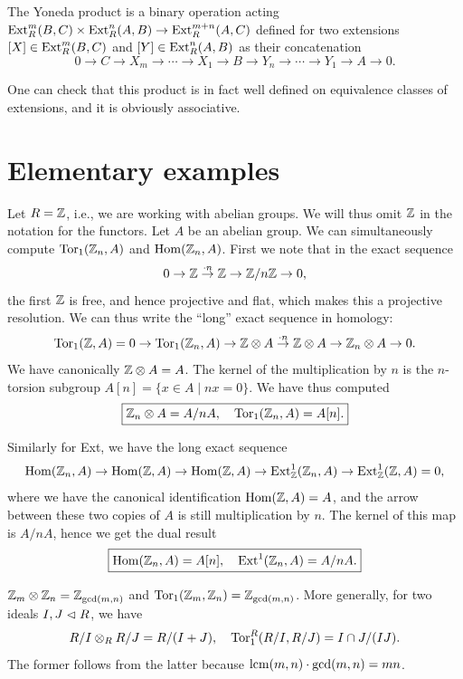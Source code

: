 \begin{defn}
    The Yoneda product is a binary operation acting $\operatorname{Ext}^m_R(B,C)\times \operatorname{Ext}^n_R(A,B)\to \operatorname{Ext}^{m+n}_R(A,C)$ defined for two extensions $[X]\in \operatorname{Ext}^m_R(B,C)$ and $[Y]\in \operatorname{Ext}^n_R(A,B)$ as their concatenation
    \[0\to C\to X_m\to \cdots \to X_1\to B\to Y_n\to \cdots\to Y_1\to A\to 0.\]
\end{defn}

One can check that this product is in fact well defined on equivalence classes of extensions, and it is obviously associative.


\section{Elementary examples}

Let $R=\mathbb{Z}$, i.e., we are working with abelian groups. We will thus omit $\mathbb{Z}$ in the notation for the functors. Let $A$ be an abelian group. We can simultaneously compute $\operatorname{Tor}_1(\mathbb{Z}_n,A)$ and $\operatorname{Hom}(\mathbb{Z}_n,A)$. First we note that in the exact sequence
\[0\to \mathbb{Z}\overset{\cdot n}{\to}\mathbb{Z}\to \mathbb{Z}\slash n\mathbb{Z} \to 0,\]
the first $\mathbb{Z}$ is free, and hence projective and flat, which makes this a projective resolution. We can thus write the ``long'' exact sequence in homology:
\[\operatorname{Tor}_1(\mathbb{Z},A)=0\to \operatorname{Tor}_1(\mathbb{Z}_n,A)\to \mathbb{Z}\otimes A\overset{\cdot n}{\to} \mathbb{Z}\otimes A\to \mathbb{Z}_n\otimes A\to 0.\]
We have canonically $\mathbb{Z}\otimes A=A$. The kernel of the multiplication by $n$ is the $n$-torsion subgroup $A[n]=\{x\in A\mid nx=0\}$. We have thus computed
\[\boxed{\mathbb{Z}_n\otimes A=A\slash nA,\quad \operatorname{Tor}_1(\mathbb{Z}_n,A)=A[n].}\]

Similarly for Ext, we have the long exact sequence
\[\operatorname{Hom}(\mathbb{Z}_n,A)\to \operatorname{Hom}(\mathbb{Z},A)\to \operatorname{Hom}(\mathbb{Z},A)\to \operatorname{Ext}^1_{\mathbb{Z}}(\mathbb{Z}_n,A)\to \operatorname{Ext}^1_{\mathbb{Z}}(\mathbb{Z},A)=0,\]
where we have the canonical identification $\operatorname{Hom}(\mathbb{Z},A)=A$, and the arrow between these two copies of $A$ is still multiplication by $n$. The kernel of this map is $A\slash nA$, hence we get the dual result
\[\boxed{\operatorname{Hom}(\mathbb{Z}_n,A)=A[n],\quad \operatorname{Ext}^1(\mathbb{Z}_n,A)=A\slash nA.}\]
    
\begin{cor}
    $\mathbb{Z}_m\otimes \mathbb{Z}_n=\mathbb{Z}_{\gcd(m,n)}$ and $\operatorname{Tor}_1(\mathbb{Z}_m,\mathbb{Z}_n)=\mathbb{Z}_{\gcd(m,n)}$. More generally, for two ideals $I,J\vartriangleleft R$, we have
    \[R\slash I\otimes_R R\slash J=R\slash(I+J),\quad \operatorname{Tor}_1^R(R\slash I,R\slash J)=I\cap J\slash (IJ).\]
    The former follows from the latter because $\operatorname{lcm}(m,n)\cdot\gcd(m,n)=mn$.
\end{cor}

